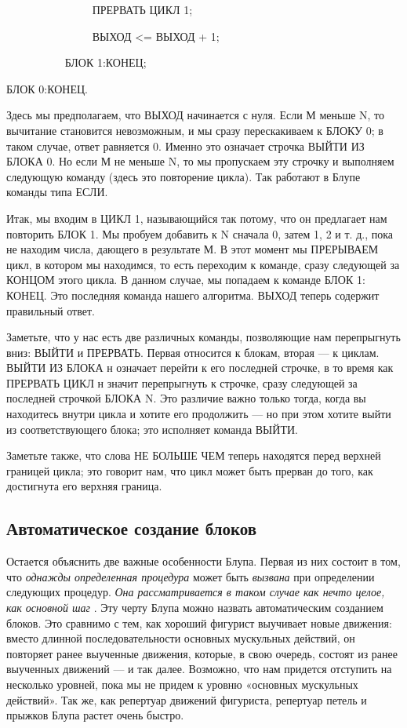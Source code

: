 \documentclass[../main.tex]{subfiles}
\begin{document}
~~~~~~~~~~~~~~~ ПРЕРВАТЬ ЦИКЛ 1;

~~~~~~~~~~~~~~~ ВЫХОД \textless= ВЫХОД + 1;

~~~~~~~~~~ БЛОК 1:КОНЕЦ;

БЛОК 0:КОНЕЦ.

Здесь мы предполагаем, что ВЫХОД начинается с нуля. Если М меньше N, то вычитание становится невозможным, и мы сразу перескакиваем к БЛОКУ 0; в таком случае, ответ равняется 0. Именно это означает строчка ВЫЙТИ ИЗ БЛОКА 0. Но если М не меньше N, то мы пропускаем эту строчку и выполняем следующую команду (здесь это повторение цикла). Так работают в Блупе команды типа ЕСЛИ.

Итак, мы входим в ЦИКЛ 1, называющийся так потому, что он предлагает нам повторить БЛОК 1. Мы пробуем добавить к N сначала 0, затем 1, 2 и т. д., пока не находим числа, дающего в результате М. В этот момент мы ПРЕРЫВАЕМ цикл, в котором мы находимся, то есть переходим к команде, сразу следующей за КОНЦОМ этого цикла. В данном случае, мы попадаем к команде БЛОК 1: КОНЕЦ. Это последняя команда нашего алгоритма. ВЫХОД теперь содержит правильный ответ.

Заметьте, что у нас есть две различных команды, позволяющие нам перепрыгнуть вниз: ВЫЙТИ и ПРЕРВАТЬ. Первая относится к блокам, вторая --- к циклам. ВЫЙТИ ИЗ БЛОКА н означает перейти к его последней строчке, в то время как ПРЕРВАТЬ ЦИКЛ н значит перепрыгнуть к строчке, сразу следующей за последней строчкой БЛОКА N. Это различие важно только тогда, когда вы находитесь внутри цикла и хотите его продолжить --- но при этом хотите выйти из соответствующего блока; это исполняет команда ВЫЙТИ.

Заметьте также, что слова НЕ БОЛЬШЕ ЧЕМ теперь находятся перед верхней границей цикла; это говорит нам, что цикл может быть прерван до того, как достигнута его верхняя граница.


\subsection{Автоматическое создание блоков}

Остается объяснить две важные особенности Блупа. Первая из них состоит в том, что \emph{однажды определенная процедура} может быть \emph{вызвана} при определении следующих процедур. \emph{Она рассматривается в таком случае как нечто целое, как основной шаг} . Эту черту Блупа можно назвать автоматическим созданием блоков. Это сравнимо с тем, как хороший фигурист выучивает новые движения: вместо длинной последовательности основных мускульных действий, он повторяет ранее выученные движения, которые, в свою очередь, состоят из ранее выученных движений --- и так далее. Возможно, что нам придется отступить на несколько уровней, пока мы не придем к уровню «основных мускульных действий». Так же, как репертуар движений фигуриста, репертуар петель и прыжков Блупа растет очень быстро.
\end{document}
